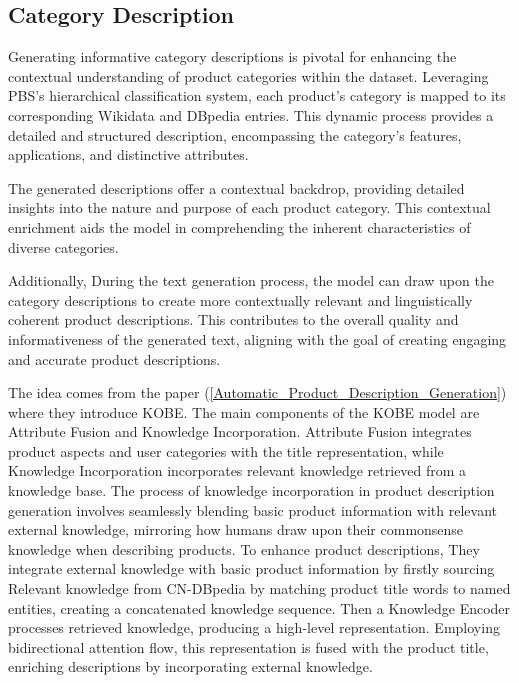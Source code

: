 \subsection{Category Description}

Generating informative category descriptions is pivotal for enhancing the contextual understanding of product categories within the dataset. Leveraging PBS's hierarchical classification system, each product's category is mapped to its corresponding Wikidata \cite{wikidata} and DBpedia \cite{dbpedia} entries. This dynamic process provides a detailed and structured description, encompassing the category's features, applications, and distinctive attributes.

The generated descriptions offer a contextual backdrop, providing detailed insights into the nature and purpose of each product category. This contextual enrichment aids the model in comprehending the inherent characteristics of diverse categories.

Additionally, During the text generation process, the model can draw upon the category descriptions to create more contextually relevant and linguistically coherent product descriptions. This contributes to the overall quality and informativeness of the generated text, aligning with the goal of creating engaging and accurate product descriptions.

The idea comes from the paper \cite{Chen_2019} (\autoref{Automatic_Product_Description_Generation}) where they introduce KOBE. The main components of the KOBE model are Attribute Fusion and Knowledge Incorporation. Attribute Fusion integrates product aspects and user categories with the title representation, while Knowledge Incorporation incorporates relevant knowledge retrieved from a knowledge base. The process of knowledge incorporation in product description generation involves seamlessly blending basic product information with relevant external knowledge, mirroring how humans draw upon their commonsense knowledge when describing products. To enhance product descriptions, They integrate external knowledge with basic product information by firstly sourcing Relevant knowledge from CN-DBpedia by matching product title words to named entities, creating a concatenated knowledge sequence. Then a Knowledge Encoder processes retrieved knowledge, producing a high-level representation. Employing bidirectional attention flow, this representation is fused with the product title, enriching descriptions by incorporating external knowledge. 


